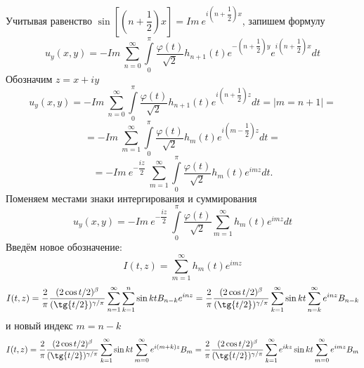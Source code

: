 \documentclass[a4paper, 9pt]{article}
\begin{document}
		Учитывая равенство
		$\sin{\left[\left(n + \dfrac12\right)x\right]} = Im \ e^{i\left(n + \dfrac12\right)x}$, запишем формулу
		\begin{equation*}
			u_y(x,y)  = -  Im \ \sum\limits_{n=0}^{\infty}  \int\limits_0^\pi \dfrac{\varphi(t)}{\sqrt2}  h_{n+1}(t)  e^{-\left(n + \dfrac12\right)y} e^{i\left(n + \dfrac12\right)x} dt
		\end{equation*}
		Обозначим $z = x + iy$
		\begin{equation*}
			u_y(x,y)  = -  Im \ \sum\limits_{n=0}^{\infty}  \int\limits_0^\pi \dfrac{\varphi(t)}{\sqrt2}  h_{n+1}(t)  e^{i\left(n+\dfrac12\right) z}  dt = \vert m = n + 1 \vert = 
		\end{equation*}
		\begin{equation*}
			 = -  Im \ \sum\limits_{m=1}^{\infty}  \int\limits_0^\pi \dfrac{\varphi(t)}{\sqrt2}  h_{m}(t)  e^{i\left(m-\dfrac12\right) z}  dt = 
		\end{equation*}
		\begin{equation*}
			 = -  Im \ e^{-\dfrac{iz}{2}}\ \sum\limits_{m=1}^{\infty}  \int\limits_0^\pi \dfrac{\varphi(t)}{\sqrt2}  h_{m}(t)  e^{im z}  dt .
		\end{equation*}
		Поменяем местами знаки интергирования и суммирования
		\begin{equation*}
			u_y(x,y)  = -  Im \ e^{-\dfrac{iz}{2}}\  \int\limits_0^\pi \dfrac{\varphi(t)}{\sqrt2}  \sum\limits_{m=1}^{\infty}   h_{m}(t)  e^{im z}  dt
		\end{equation*}
		Введём новое обозначение:
		\begin{equation*}
			I(t,z) = \sum\limits_{m=1}^{\infty}  h_{m}(t)  e^{im z}
		\end{equation*}
		\begin{equation*}
			I(t,z) =\dfrac{2}{\pi}\dfrac{(2\cos{t/2})^\beta}{(\tg{t/2})^{\gamma/\pi}} \sum\limits_{n=1}^{\infty}   \sum\limits_{k=1}^n \sin{kt} B_{n-k} e^{inz} = 
			\dfrac{2}{\pi}\dfrac{(2\cos{t/2})^\beta}{(\tg{t/2})^{\gamma/\pi}} \sum\limits_{k=1}^{\infty} \sin{kt} \sum\limits_{n=k}^{\infty} e^{inz} B_{n-k}
		\end{equation*}
		и новый индекс $m = n - k$
		\begin{equation*}
			I(t,z) = \dfrac{2}{\pi}\dfrac{(2\cos{t/2})^\beta}{(\tg{t/2})^{\gamma/\pi}} \sum\limits_{k=1}^{\infty} \sin{kt} \sum\limits_{m =0 }^{\infty} e^{i(m+k)z} B_{m} = 
			\dfrac{2}{\pi}\dfrac{(2\cos{t/2})^\beta}{(\tg{t/2})^{\gamma/\pi}} \sum\limits_{k=1}^{\infty} e^{ikz}\sin{kt} \sum\limits_{m =0 }^{\infty} e^{imz} B_{m}
		\end{equation*}
\end{document}
